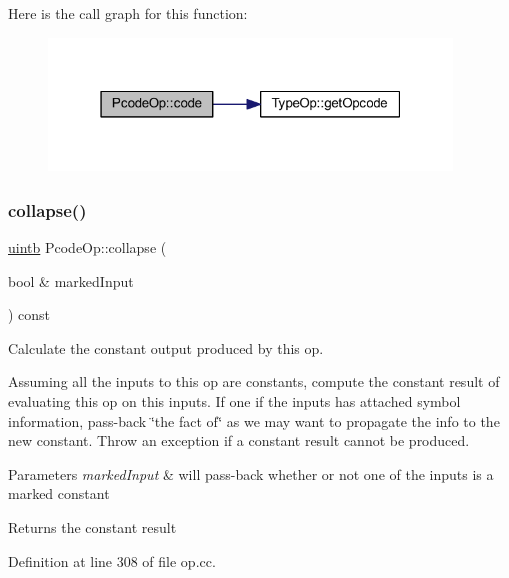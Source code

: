Here is the call graph for this function\+:
\nopagebreak
\begin{figure}[H]
\begin{center}
\leavevmode
\includegraphics[width=304pt]{class_pcode_op_a4879c54b797d545d0cc149dd8bed7940_cgraph}
\end{center}
\end{figure}
\mbox{\label{class_pcode_op_a6fd640f1b530d2a3a6aa330f7bde7dfe}} 
\subsubsection{\texorpdfstring{collapse()}{collapse()}}
{\footnotesize\ttfamily \mbox{\hyperlink{types_8h_a2db313c5d32a12b01d26ac9b3bca178f}{uintb}} Pcode\+Op\+::collapse (\begin{DoxyParamCaption}\item[{bool \&}]{marked\+Input }\end{DoxyParamCaption}) const}



Calculate the constant output produced by this op. 

Assuming all the inputs to this op are constants, compute the constant result of evaluating this op on this inputs. If one if the inputs has attached symbol information, pass-\/back \char`\"{}the fact of\char`\"{} as we may want to propagate the info to the new constant. Throw an exception if a constant result cannot be produced. 
\begin{DoxyParams}{Parameters}
{\em marked\+Input} & will pass-\/back whether or not one of the inputs is a marked constant \\
\hline
\end{DoxyParams}
\begin{DoxyReturn}{Returns}
the constant result 
\end{DoxyReturn}


Definition at line 308 of file op.\+cc.

\mbox{\label{class_pcode_op_a84d465c2dc9db2670ebfbf1cb148944c}} 
